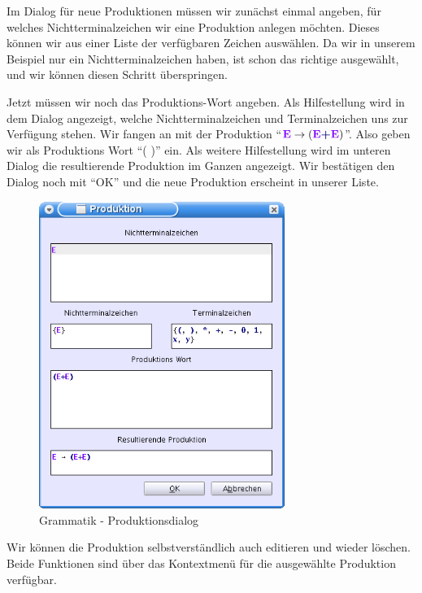 Im Dialog für neue Produktionen müssen wir zunächst einmal angeben, für welches
Nichtterminalzeichen wir eine Produktion anlegen möchten. Dieses können wir aus
einer Liste der verfügbaren Zeichen auswählen. Da wir in unserem Beispiel nur
ein Nichtterminalzeichen haben, ist schon das richtige ausgewählt, und wir
können diesen Schritt überspringen.\vspace{10pt}

Jetzt müssen wir noch das Produktions-Wort angeben. Als Hilfestellung wird in
dem Dialog angezeigt, welche Nichtterminalzeichen und Terminalzeichen uns zur
Verfügung stehen. Wir fangen an mit der Produktion "`$\StartSymbol{E} \to
(\StartSymbol{E} \TerminalSymbol{+} \StartSymbol{E})$"'. Also geben wir als
Produktions Wort "`( \TerminalSymbol{+} )"' ein.
Als weitere Hilfestellung wird im unteren Dialog die resultierende Produktion im
Ganzen angezeigt. Wir bestätigen den Dialog noch mit "`OK"' und die neue
Produktion erscheint in unserer Liste.\vspace{10pt}

\begin{figure}[h]
\begin{center}
\includegraphics[width=8cm]{../images/production_dialog.png}
\caption{Grammatik - Produktionsdialog}
\end{center}
\end{figure}

Wir können die Produktion selbstverständlich auch editieren und wieder löschen.
Beide Funktionen sind über das Kontextmenü für die ausgewählte Produktion
verfügbar.\vspace{10pt}


